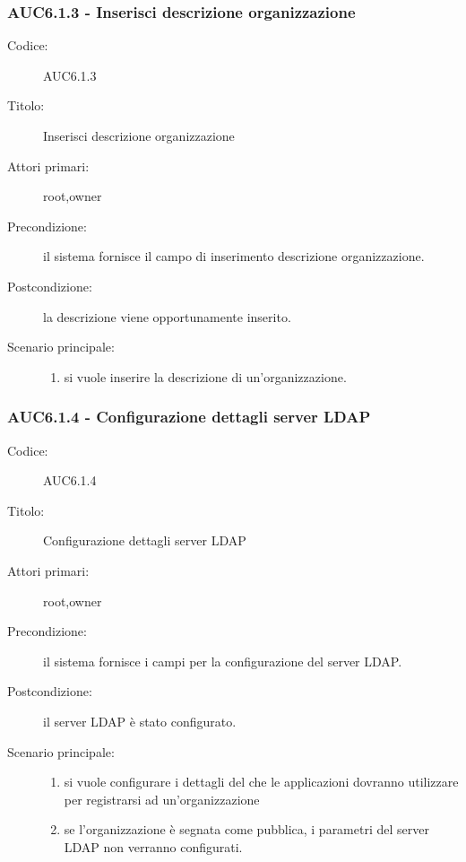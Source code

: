\documentclass[casi-duso]{subfiles}
\begin{document}
  \subsubsection{AUC6.1.3 - Inserisci descrizione organizzazione}%
  \label{subsub:AUC6.1.3}
  \begin{description}
    \item[Codice:] AUC6.1.3
    \item[Titolo:] Inserisci descrizione organizzazione
    \item[Attori primari:] root,owner
    \item[Precondizione:] il sistema fornisce il campo di inserimento descrizione organizzazione.
    \item[Postcondizione:] la descrizione viene opportunamente inserito.
    \item[Scenario principale:]
    \begin{enumerate}
      \item si vuole inserire la descrizione di un'organizzazione.
    \end{enumerate}
  \end{description}

  \subsubsection{AUC6.1.4 - Configurazione dettagli server LDAP}%
  \label{subsub:AUC6.1.4}
  \begin{description}
    \item[Codice:] AUC6.1.4
    \item[Titolo:] Configurazione dettagli server LDAP
    \item[Attori primari:] root,owner
    \item[Precondizione:] il sistema fornisce i campi per la configurazione del server LDAP.
    \item[Postcondizione:] il server LDAP è stato configurato.
    \item[Scenario principale:]
    \begin{enumerate}
      \item si vuole configurare i dettagli del  che le applicazioni dovranno utilizzare per registrarsi ad un'organizzazione
      \item se l'organizzazione è segnata come pubblica, i parametri del server LDAP non verranno configurati. 
    \end{enumerate}
  \end{description}
\end{document}
